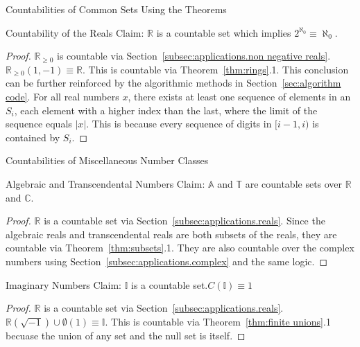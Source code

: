 \documentclass[12pt]{article}
\begin{document}
\begin{section}{Countabilities of Common Sets Using the Theorems}
	\begin{subsection}{Countability of the Reals}\label{subsec:applications.reals}
		Claim: $\mathbb R$ is a countable set which implies $2^{\aleph_0}\equiv\aleph_0$.
		\begin{proof}
			$\mathbb R_{\geqslant0}$ is countable via Section~\ref{subsec:applications.non negative reals}.
			$\mathbb R_{\geqslant0}(1, -1)\equiv\mathbb R$. This is countable via
			Theorem~\ref{thm:rings}.1. This conclusion can be further reinforced by
			the algorithmic methods in Section~\ref{sec:algorithm code}. For all real
			numbers $x$, there exists at least one sequence of elements in an $S_i$,
			each element with a higher index than the last, where the limit of the sequence
			equals $|x|$. This is because every sequence of digits in $[i-1,i)$ is contained by $S_i$.
		\end{proof}
	\end{subsection}

	\begin{subsection}{Countabilities of Miscellaneous Number Classes}
	\label{subsec:applications.miscellaneous}
		\begin{subsubsection}{Algebraic and Transcendental Numbers}
			\label{subsubsec:applications.misc.reals}
			Claim: $\mathbb A$ and $\mathbb T$ are countable sets over $\mathbb R$ and $\mathbb C$.
			\begin{proof}
				$\mathbb R$ is a countable set via Section~\ref{subsec:applications.reals}.
				Since the algebraic reals and transcendental reals are both subsets of the
				reals, they are countable via Theorem~\ref{thm:subsets}.1. They are also
				countable over the complex numbers using Section~\ref{subsec:applications.complex}
				and the same logic.
			\end{proof}
		\end{subsubsection}

		\begin{subsubsection}{Imaginary Numbers}\label{subsubsec:applications.misc.imaginary}
			Claim: $\mathbb I$ is a countable set.\hspace{2em}$C(\mathbb I)\equiv1$
			\begin{proof}
				$\mathbb R$ is a countable set via Section~\ref{subsec:applications.reals}.
				$\mathbb R(\sqrt{-1})\cup\emptyset(1)\equiv\mathbb I$. This is countable via
				Theorem~\ref{thm:finite unions}.1 becuase the union of any set and the null set
				is itself.
			\end{proof}
		\end{subsubsection}
	\end{subsection}


\end{section}
\end{document}
